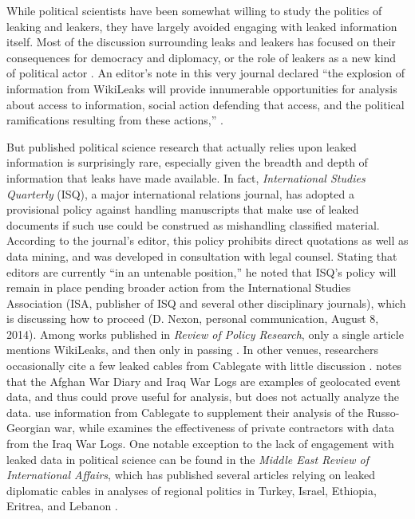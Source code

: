 \documentclass[12pt]{article}
\begin{document}
While political scientists have been somewhat willing to study the politics of leaking and leakers, 
they have largely avoided engaging with leaked information itself.
Most of the discussion surrounding leaks and leakers has focused on 
their consequences for democracy and diplomacy, or the role of 
leakers as a new kind of political actor \citep{simmons2011international,
davis2012political,pieterse2012leaking,springer2012leaky,
wong2013e-bandits}. An editor's note in this very journal declared ``the explosion of information 
from WikiLeaks will provide innumerable opportunities for analysis about access to information, social action 
defending that access, and the political ramifications resulting from these actions,'' \citep[123]{gore2011editors}.

But published political science research that actually relies upon leaked information is surprisingly rare, especially given the breadth and depth of information that leaks have made 
available. 
In fact, \emph{International Studies Quarterly} (ISQ), a major international relations journal, has adopted a provisional policy against handling manuscripts that make use of leaked documents if such use could be construed as mishandling classified material. According to the journal's editor, this policy prohibits direct quotations as well as data mining, and was developed in consultation with legal counsel. Stating that editors are currently ``in an untenable position,'' he noted that ISQ's policy will remain in place pending broader action from the International Studies Association (ISA, publisher of ISQ and several other disciplinary journals), which is discussing how to proceed (D. Nexon, personal communication, August 8, 2014).
Among works published in \textit{Review of Policy Research}, only a single article mentions WikiLeaks, and then only in passing \citep{kingiri2012role}.
In other venues, researchers occasionally cite a few leaked cables from 
Cablegate with little discussion \citep{bowen2011irans,guliyev2012political}.
\citet{schrodt2012precedents} notes that the Afghan War Diary and Iraq War Logs are examples of 
geolocated event data, and thus could prove useful for analysis, but does not actually analyze the 
data.
\citet{mouritzen2012explaining} use information from Cablegate to supplement their analysis of the 
Russo-Georgian war, while
\citet{petersohn2013effectiveness} examines the effectiveness of private contractors with data from the 
Iraq War Logs. 
One notable exception to the lack of engagement with leaked data in political science 
can be found in the \emph{Middle East Review of International Affairs}, which has published several 
articles relying on leaked diplomatic cables in analyses of regional politics in Turkey, Israel, 
Ethiopia, Eritrea, and Lebanon \citep{altiparmak2011wikileaks,
spyer2011israel,lefebvre2012choosing,smyth2011``independent}.
\end{document}
